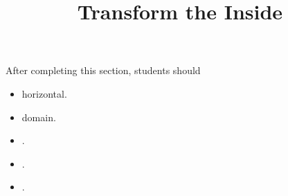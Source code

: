 \documentclass{ximera}
\title{Transform the Inside}
\begin{document}
\begin{abstract}
\end{abstract}
\maketitle

\begin{sectionOutcomes}
After completing this section, students should 

\begin{itemize}
\item horizontal.
\item domain.
\item .
\item .
\item .
\end{itemize}
\end{sectionOutcomes}
\end{document}
